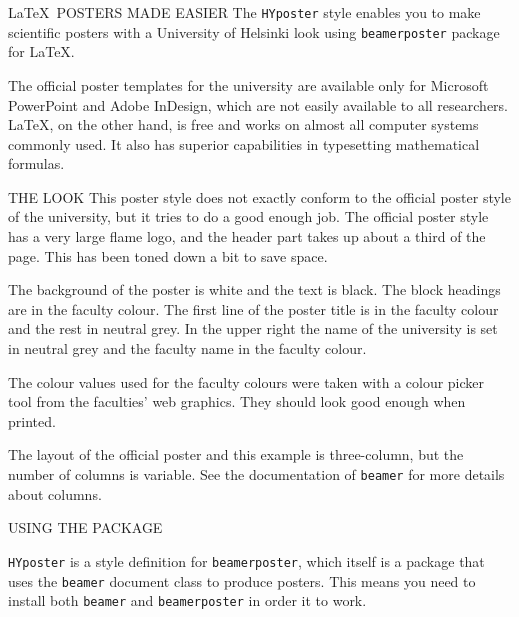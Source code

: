 \documentclass[final]{beamer}
\author[Wilkman]{Olli Wilkman}
\institute[University of Helsinki]{}
\date{\today}
\begin{document}
\begin{frame}[t, fragile]
\begin{columns}[T]
	
\begin{column}{0.32\linewidth}


\begin{block}{\LaTeX~POSTERS MADE EASIER}
The \texttt{HYposter} style enables you to make scientific posters with a University of Helsinki look using  \texttt{beamerposter} package for \LaTeX. 

The official poster templates for the university are available only for Microsoft PowerPoint and Adobe InDesign, which are not easily available to all researchers. \LaTeX, on the other hand, is free and works on almost all computer systems commonly used. It also has superior capabilities in typesetting mathematical formulas.

\end{block}


\begin{block}{THE LOOK}
This poster style does not exactly conform to the official poster style of the university, but it tries to do a good enough job. The official poster style has a very large flame logo, and the header part takes up about a third of the page. This has been toned down a bit to save space.

The background of the poster is white and the text is black. The block headings are in the faculty colour. The first line of the poster title is in the faculty colour and the rest in neutral grey. In the upper right the name of the university is set in neutral grey and the faculty name in the faculty colour.

The colour values used for the faculty colours were taken with a colour picker tool from the faculties' web graphics. They should look good enough when printed.

The layout of the official poster and this example is three-column, but the number of columns is variable. See the documentation of \texttt{beamer} for more details about columns.
\end{block}


\begin{block}{USING THE PACKAGE}

\texttt{HYposter} is a style definition for \texttt{beamerposter}, which itself is a package that uses the \texttt{beamer} document class to produce posters. This means you need to install both \texttt{beamer} and \texttt{beamerposter} in order it to work.


\end{block}
\end{column}
\end{columns}
\end{frame}
\end{document}
